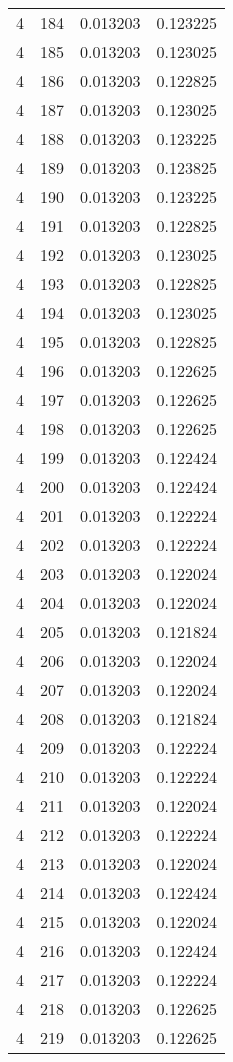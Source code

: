 \begin{longtable}{rrrr}
4 & 184 & 0.013203 & 0.123225 \\
4 & 185 & 0.013203 & 0.123025 \\
4 & 186 & 0.013203 & 0.122825 \\
4 & 187 & 0.013203 & 0.123025 \\
4 & 188 & 0.013203 & 0.123225 \\
4 & 189 & 0.013203 & 0.123825 \\
4 & 190 & 0.013203 & 0.123225 \\
4 & 191 & 0.013203 & 0.122825 \\
4 & 192 & 0.013203 & 0.123025 \\
4 & 193 & 0.013203 & 0.122825 \\
4 & 194 & 0.013203 & 0.123025 \\
4 & 195 & 0.013203 & 0.122825 \\
4 & 196 & 0.013203 & 0.122625 \\
4 & 197 & 0.013203 & 0.122625 \\
4 & 198 & 0.013203 & 0.122625 \\
4 & 199 & 0.013203 & 0.122424 \\
4 & 200 & 0.013203 & 0.122424 \\
4 & 201 & 0.013203 & 0.122224 \\
4 & 202 & 0.013203 & 0.122224 \\
4 & 203 & 0.013203 & 0.122024 \\
4 & 204 & 0.013203 & 0.122024 \\
4 & 205 & 0.013203 & 0.121824 \\
4 & 206 & 0.013203 & 0.122024 \\
4 & 207 & 0.013203 & 0.122024 \\
4 & 208 & 0.013203 & 0.121824 \\
4 & 209 & 0.013203 & 0.122224 \\
4 & 210 & 0.013203 & 0.122224 \\
4 & 211 & 0.013203 & 0.122024 \\
4 & 212 & 0.013203 & 0.122224 \\
4 & 213 & 0.013203 & 0.122024 \\
4 & 214 & 0.013203 & 0.122424 \\
4 & 215 & 0.013203 & 0.122024 \\
4 & 216 & 0.013203 & 0.122424 \\
4 & 217 & 0.013203 & 0.122224 \\
4 & 218 & 0.013203 & 0.122625 \\
4 & 219 & 0.013203 & 0.122625 \\

\end{longtable}
